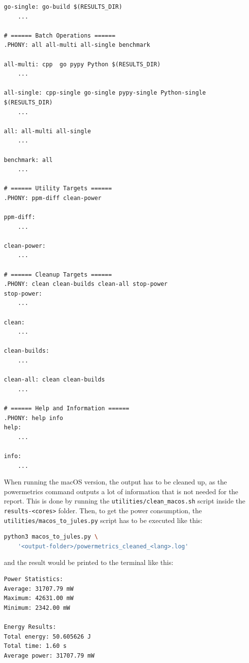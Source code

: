 \begin{lstlisting}[caption={Makefile for running the program.}, label={lst:makefile_run}]
go-single: go-build $(RESULTS_DIR)
	...
    
# ====== Batch Operations ======
.PHONY: all all-multi all-single benchmark

all-multi: cpp  go pypy Python $(RESULTS_DIR)
	...

all-single: cpp-single go-single pypy-single Python-single $(RESULTS_DIR)
	...

all: all-multi all-single
	...

benchmark: all
	...

# ====== Utility Targets ======
.PHONY: ppm-diff clean-power

ppm-diff:
	...

clean-power:
	...

# ====== Cleanup Targets ======
.PHONY: clean clean-builds clean-all stop-power
stop-power:
	...

clean:
	...

clean-builds:
	...

clean-all: clean clean-builds
	...

# ====== Help and Information ======
.PHONY: help info
help:
	...

info:
	...
\end{lstlisting}

When running the macOS version, the output has to be cleaned up, as the powermetrics command outputs a lot of information that is not needed for the report. This is done by running the \texttt{utilities/clean\_macos.sh} script inside the \texttt{results-<cores>} folder. Then, to get the power consumption, the \texttt{utilities/macos\_to\_jules.py} script has to be executed like this:
\begin{lstlisting}[language=bash, caption={Running the power consumption script.}, label={lst:macos_power_script}]
python3 macos_to_jules.py \
    '<output-folder>/powermetrics_cleaned_<lang>.log'
\end{lstlisting}

and the result would be printed to the terminal like this:
\begin{lstlisting}[language=bash, caption={Power consumption output.}, label={lst:macos_power_output}]
Power Statistics:
Average: 31707.79 mW
Maximum: 42631.00 mW
Minimum: 2342.00 mW

Energy Results:
Total energy: 50.605626 J
Total time: 1.60 s
Average power: 31707.79 mW
\end{lstlisting}